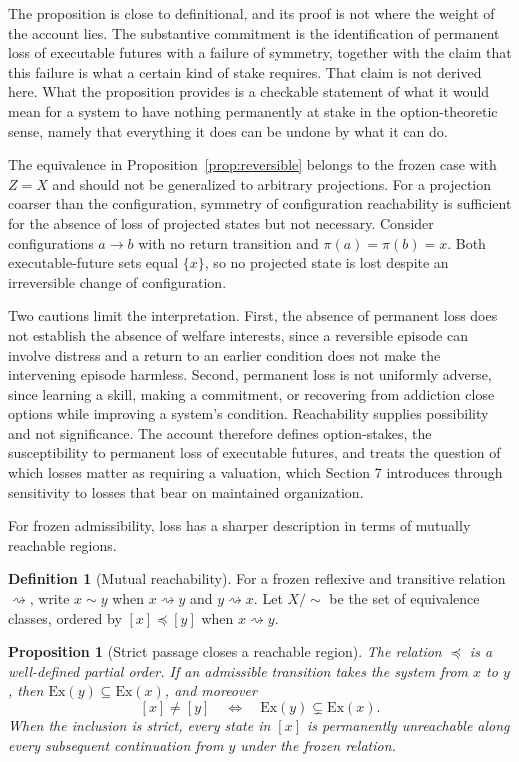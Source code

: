 \documentclass[11pt]{article}
\theoremstyle{definition}
\newtheorem{definition}{Definition}
\theoremstyle{plain}
\newtheorem{proposition}{Proposition}
\theoremstyle{remark}
\newcommand{\reaches}{\rightsquigarrow}
\begin{document}
The proposition is close to definitional, and its proof is not where the weight of the account lies. The substantive commitment is the identification of permanent loss of executable futures with a failure of symmetry, together with the claim that this failure is what a certain kind of stake requires. That claim is not derived here. What the proposition provides is a checkable statement of what it would mean for a system to have nothing permanently at stake in the option-theoretic sense, namely that everything it does can be undone by what it can do.

The equivalence in Proposition~\ref{prop:reversible} belongs to the frozen case with $Z = X$ and should not be generalized to arbitrary projections. For a projection coarser than the configuration, symmetry of configuration reachability is sufficient for the absence of loss of projected states but not necessary. Consider configurations $a \to b$ with no return transition and $\pi(a) = \pi(b) = x$. Both executable-future sets equal $\{x\}$, so no projected state is lost despite an irreversible change of configuration.

Two cautions limit the interpretation. First, the absence of permanent loss does not establish the absence of welfare interests, since a reversible episode can involve distress and a return to an earlier condition does not make the intervening episode harmless. Second, permanent loss is not uniformly adverse, since learning a skill, making a commitment, or recovering from addiction close options while improving a system's condition. Reachability supplies possibility and not significance. The account therefore defines option-stakes, the susceptibility to permanent loss of executable futures, and treats the question of which losses matter as requiring a valuation, which Section 7 introduces through sensitivity to losses that bear on maintained organization.

For frozen admissibility, loss has a sharper description in terms of mutually reachable regions.

\begin{definition}[Mutual reachability]
For a frozen reflexive and transitive relation $\reaches$, write $x \sim y$ when $x \reaches y$ and $y \reaches x$. Let $X/{\sim}$ be the set of equivalence classes, ordered by $[x] \preceq [y]$ when $x \reaches y$.
\end{definition}

\begin{proposition}[Strict passage closes a reachable region]
The relation $\preceq$ is a well-defined partial order. If an admissible transition takes the system from $x$ to $y$, then $\mathrm{Ex}(y) \subseteq \mathrm{Ex}(x)$, and moreover
\[
[x] \neq [y] \quad\Longleftrightarrow\quad \mathrm{Ex}(y) \subsetneq \mathrm{Ex}(x).
\]
When the inclusion is strict, every state in $[x]$ is permanently unreachable along every subsequent continuation from $y$ under the frozen relation.
\end{proposition}
\end{document}
